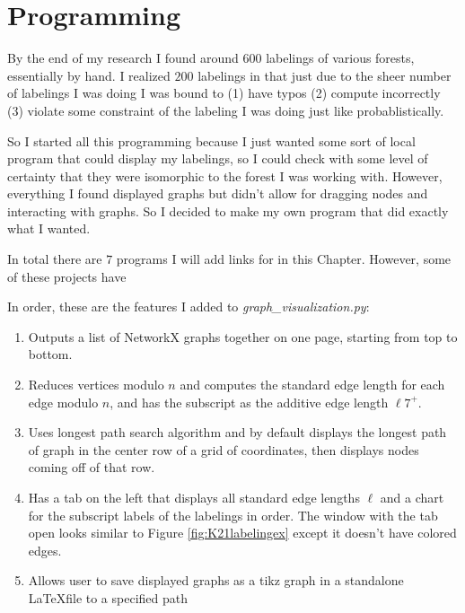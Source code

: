 \chapter{Programming}\label{chap:programming}
By the end of my research I found around $600$ labelings of various forests, essentially by hand. I realized $200$ labelings in that just due to the sheer number of labelings I was doing I was bound to (1) have typos (2) compute incorrectly (3) violate some constraint of the labeling I was doing just like probablistically.

So I started all this programming because I just wanted some sort of local program that could display my labelings, so I could check with some level of certainty that they were isomorphic to the forest I was working with. However, everything I found displayed graphs but didn't allow for dragging nodes and interacting with graphs. So I decided to make my own program that did exactly what I wanted.

In total there are $7$ programs I will add links for in this Chapter. However, some of these projects have 

In order, these are the features I added to \textit{graph\_visualization.py}:
\begin{enumerate}
  \item Outputs a list of NetworkX graphs together on one page, starting from top to bottom.
  \item Reduces vertices modulo $n$ and computes the standard edge length for each edge modulo $n$, and has the subscript as the additive edge length $\ell{7}^{+}$.
  \item Uses longest path search algorithm and by default displays the longest path of graph in the center row of a grid of coordinates, then displays nodes coming off of that row.
  \item Has a tab on the left that displays all standard edge lengths $\ell$ and a chart for the subscript labels of the labelings in order. The window with the tab open looks similar to Figure \ref{fig:K21labelingex} except it doesn't have colored edges.
  \item Allows user to save displayed graphs as a tikz graph in a standalone \LaTeX file to a specified path
\end{enumerate}